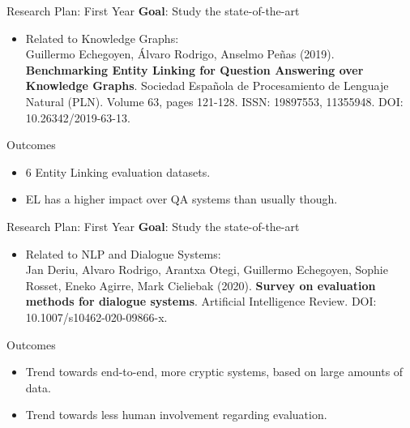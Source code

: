 \documentclass{beamer}
\begin{document}

\begin{frame}{Research Plan: First Year}
  \alert{\textbf{Goal}}: Study the state-of-the-art
  \vspace{0.2cm}
  \begin{itemize}
    \item Related to Knowledge Graphs: \\
      {\small Guillermo Echegoyen, Álvaro Rodrigo, Anselmo Peñas (2019). \textbf{Benchmarking Entity Linking for Question Answering over Knowledge Graphs}. Sociedad Espa\~nola de Procesamiento de Lenguaje Natural (PLN). Volume 63, pages 121-128. ISSN: 19897553, 11355948. DOI: 10.26342/2019-63-13. \cite{Echegoyen2019}}
  \end{itemize}
  \begin{block}{Outcomes}
    \begin{itemize}
      \item 6 Entity Linking evaluation datasets.
      \item EL has a higher impact over QA systems than usually though.
    \end{itemize}
  \end{block}
\end{frame}

\begin{frame}{Research Plan: First Year}
  \alert{\textbf{Goal}}: Study the state-of-the-art
  \vspace{0.2cm}
  \begin{itemize}
    \item Related to NLP and Dialogue Systems: \\
      {\small Jan Deriu, Alvaro Rodrigo, Arantxa Otegi, Guillermo Echegoyen, Sophie Rosset, Eneko Agirre, Mark Cieliebak (2020). \textbf{Survey on evaluation methods for dialogue systems}. Artificial Intelligence Review. DOI: 10.1007/s10462-020-09866-x. \cite{jan_survey_2020}}
  \end{itemize}
  \begin{block}{Outcomes}
    \begin{itemize}
      \item Trend towards end-to-end, more cryptic systems, based on large amounts of data.
      \item Trend towards less human involvement regarding evaluation. 
    \end{itemize}
  \end{block}
\end{frame}
\end{document}

